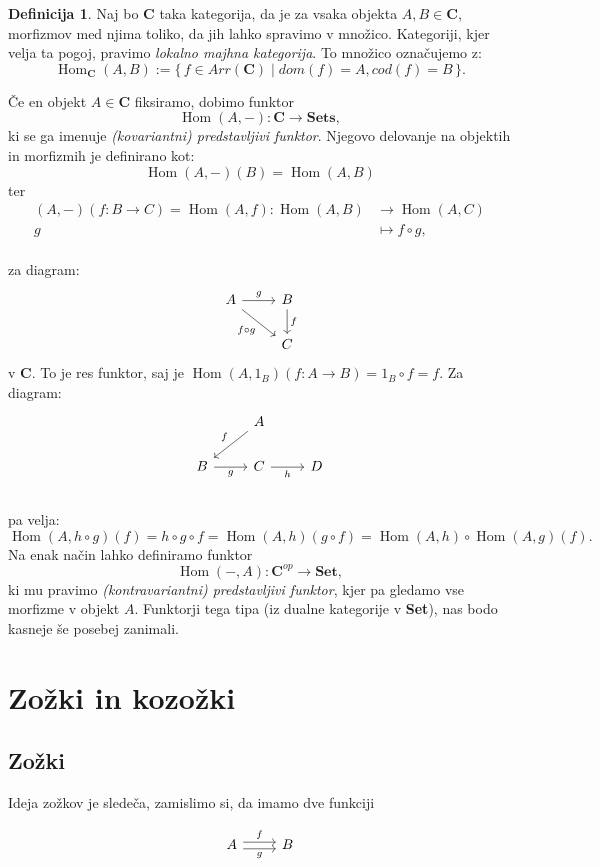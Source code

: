 \documentclass[12pt,a4paper]{book}
\theoremstyle{definition}
\newtheorem{definicija}{Definicija}[chapter]
\theoremstyle{plain}
\theoremstyle{definition}
\theoremstyle{remark}
\newcommand{\cat}[1]{\textbf{#1}}
\DeclareMathOperator{\Hom}{Hom}
\renewcommand{\set}[1]{\{\,#1\,\}}
\begin{document}
\begin{definicija}

Naj bo $\cat{C}$ taka kategorija, da je za vsaka objekta $A,B \in \cat{C}$, morfizmov med njima toliko, da jih lahko spravimo v množico. Kategoriji, kjer velja ta pogoj, pravimo \emph{lokalno majhna kategorija}. To množico označujemo z:
$$\Hom_{\cat{C}}(A,B) := \set{f \in Arr(\cat{C}) \mid dom(f) = A, cod(f) = B}.$$
\end{definicija}
Če en objekt $A \in \cat{C}$ fiksiramo, dobimo funktor
$$\Hom(A,-) : \cat{C} \to \cat{Sets},$$
ki se ga imenuje \emph{(kovariantni) predstavljivi funktor}. Njegovo delovanje na objektih in morfizmih je definirano kot:
$$\Hom(A,-)(B) = \Hom(A,B)$$
ter
\begin{align*}
(A,-)(f : B \to C) = \Hom(A,f): \Hom(A,B) &\to \Hom(A,C) \\
g &\mapsto f \circ g, \\
\end{align*}

za diagram:
$$ \begin{tikzcd}
A \ar[r, "g"] \ar[rd, "f \circ g"'] & B \ar[d, "f"] \\
& C
\end{tikzcd} $$
v $\cat{C}$.
To je res funktor, saj je $\Hom(A,1_B)(f:A \to B) = 1_B \circ f = f$. Za diagram: 
$$ \begin{tikzcd}
& A \ar[dl, "f"'] & \\
B \ar[r, "g"'] & C \ar[r, "h"'] & D \\
\end{tikzcd} $$
pa velja:
$$
\Hom(A,h \circ g)(f) = h \circ g \circ f = \Hom(A,h)(g \circ f) = \Hom(A,h) \circ \Hom(A,g)(f).
$$
Na enak način lahko definiramo funktor
$$\Hom(-,A) : \cat{C}^{op} \to \cat{Set},$$
ki mu pravimo \emph{(kontravariantni) predstavljivi funktor},
kjer pa gledamo vse morfizme v objekt $A$. Funktorji tega tipa (iz dualne kategorije v \cat{Set}), nas bodo kasneje še posebej zanimali.

\section{Zožki in kozožki}

\subsection{Zožki}
Ideja zožkov je sledeča, zamislimo si, da imamo dve funkciji

$$\begin{tikzcd}
A \ar[r, shift left, "f"] \ar[r, shift right, "g"'] & B 
\end{tikzcd}$$
\end{document}
